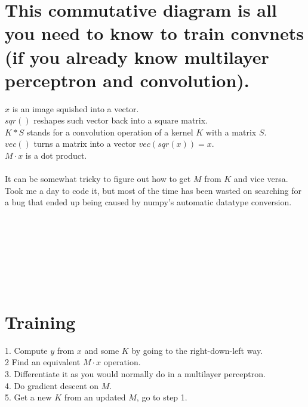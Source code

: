 \documentclass{article}
\begin{document}
\section*{\Large This commutative diagram is all you need to know to train convnets
(if you already know multilayer perceptron and convolution).} 
$x$ is an image squished into a vector.  \\
$sqr()$ reshapes such vector back into a square matrix. \\
$K * S$ stands for a convolution operation of a kernel $K$ with a matrix $S$. \\
$vec()$ turns a matrix into a vector $vec(sqr(x)) = x$. \\
$M \cdot x$ is a dot product. \\
\\
It can be somewhat tricky to figure out how to get $M$ from $K$ and vice versa. \\
Took me a day to code it, but most of the time has been wasted on searching for a bug that ended up being caused by numpy's automatic datatype conversion. \\
\\
\begin{huge}
\xymatrixrowsep{104mm} %
\xymatrixcolsep{104mm}
\end{huge}\\
\\
\\
\\
\\
\section*{\Large Training }
1. Compute $y$ from $x$ and some $K$ by going to the right-down-left way. \\
2 Find an equivalent $M \cdot x$ operation. \\
3. Differentiate it as you would normally do in a multilayer perceptron. \\
4. Do gradient descent on $M$. \\
5. Get a new $K$ from an updated $M$, go to step 1.
\\
\\
\end{document}
